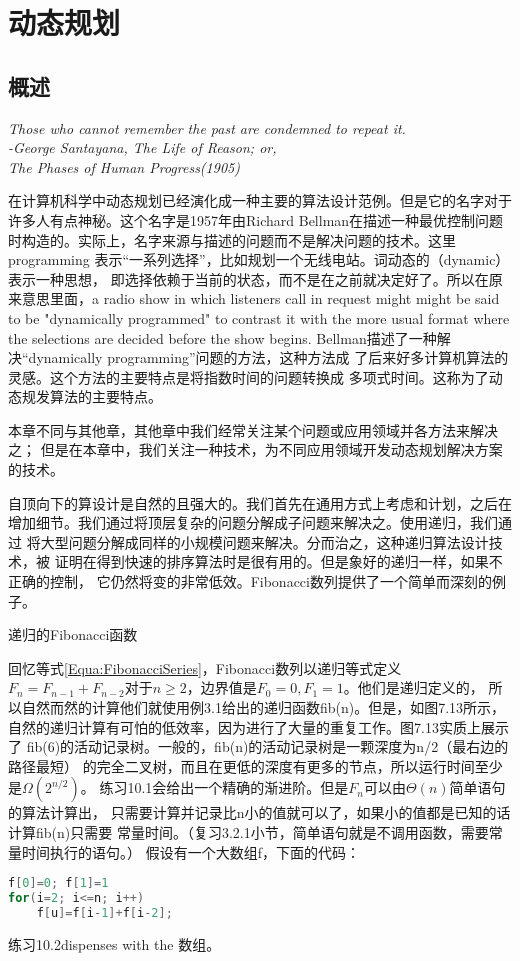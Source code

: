 \chapter{动态规划}\label{Sec:Chapter:DynamicProgramming}
\section{概述}
\noindent\emph{Those who cannot remember the past are condemned to repeat it.}\\
\indent \indent \emph{-George Santayana, The Life of Reason; or,}\\
\indent \indent \emph{The Phases of Human Progress(1905)}

在计算机科学中动态规划已经演化成一种主要的算法设计范例。但是它的名字对于
许多人有点神秘。这个名字是1957年由Richard Bellman在描述一种最优控制问题
时构造的。实际上，名字来源与描述的问题而不是解决问题的技术。这里programming
表示“一系列选择”，比如规划一个无线电站。词动态的（dynamic）表示一种思想，
即选择依赖于当前的状态，而不是在之前就决定好了。所以在原来意思里面，a
radio show in which listeners call in request might might be said to
be "dynamically programmed" to contrast it with the more usual
format where the selections are decided before the show begins.
Bellman描述了一种解决“dynamically  programming”问题的方法，这种方法成
了后来好多计算机算法的灵感。这个方法的主要特点是将指数时间的问题转换成
多项式时间。这称为了动态规发算法的主要特点。

本章不同与其他章，其他章中我们经常关注某个问题或应用领域并各方法来解决之；
但是在本章中，我们关注一种技术，为不同应用领域开发动态规划解决方案的技术。

自顶向下的算设计是自然的且强大的。我们首先在通用方式上考虑和计划，之后在
增加细节。我们通过将顶层复杂的问题分解成子问题来解决之。使用递归，我们通过
将大型问题分解成同样的小规模问题来解决。分而治之，这种递归算法设计技术，被
证明在得到快速的排序算法时是很有用的。但是象好的递归一样，如果不正确的控制，
它仍然将变的非常低效。Fibonacci数列提供了一个简单而深刻的例子。

\begin{example}
递归的Fibonacci函数

回忆等式\ref{Equa:FibonacciSeries}，Fibonacci数列以递归等式定义
$F_n=F_{n-1}+F_{n-2}$对于$n\geq 2$，边界值是$F_0=0,F_1=1$。他们是递归定义的，
所以自然而然的计算他们就使用例3.1给出的递归函数fib(n)。但是，如图7.13所示，
自然的递归计算有可怕的低效率，因为进行了大量的重复工作。图7.13实质上展示了
fib(6)的活动记录树。一般的，fib(n)的活动记录树是一颗深度为n/2（最右边的路径最短）
的完全二叉树，而且在更低的深度有更多的节点，所以运行时间至少是$\Omega(2^{n/2})$。
练习10.1会给出一个精确的渐进阶。但是$F_n$可以由$\Theta(n)$简单语句的算法计算出，
只需要计算并记录比n小的值就可以了，如果小的值都是已知的话计算fib(n)只需要
常量时间。（复习3.2.1小节，简单语句就是不调用函数，需要常量时间执行的语句。）
假设有一个大数组f，下面的代码：
\begin{lstlisting}[language={Java},keywordstyle=\color{blue!70}, commentstyle=\color{red!50!green!50!blue!50}]
f[0]=0; f[1]=1
for(i=2; i<=n; i++)
    f[u]=f[i-1]+f[i-2];
\end{lstlisting}
练习10.2dispenses with the 数组。
\end{example}


